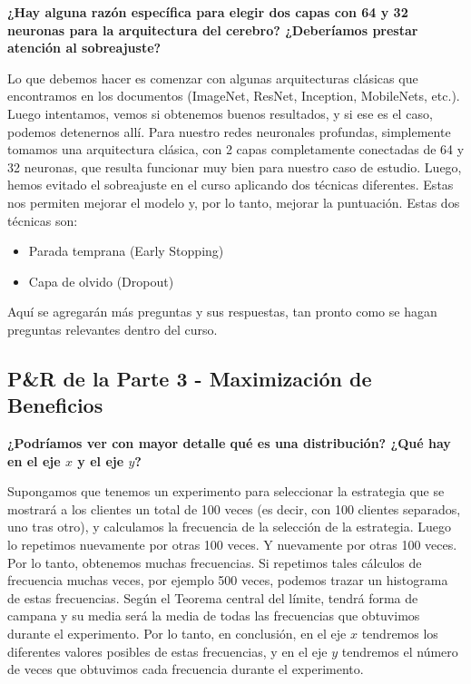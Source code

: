 \documentclass[]{book}
\providecommand{\tightlist}{%
  \setlength{\itemsep}{0pt}\setlength{\parskip}{0pt}}
\begin{document}
\textbf{¿Hay alguna razón específica para elegir dos capas con 64 y 32 neuronas para la arquitectura del cerebro? ¿Deberíamos prestar atención al sobreajuste?}

Lo que debemos hacer es comenzar con algunas arquitecturas clásicas que encontramos en los documentos (ImageNet, ResNet, Inception, MobileNets, etc.). Luego intentamos, vemos si obtenemos buenos resultados, y si ese es el caso, podemos detenernos allí. Para nuestro redes neuronales profundas, simplemente tomamos una arquitectura clásica, con 2 capas completamente conectadas de 64 y 32 neuronas, que resulta funcionar muy bien para nuestro caso de estudio. Luego, hemos evitado el sobreajuste en el curso aplicando dos técnicas diferentes. Estas nos permiten mejorar el modelo y, por lo tanto, mejorar la puntuación. Estas dos técnicas son:

\begin{itemize}
\tightlist
\item
  Parada temprana (Early Stopping)
\item
  Capa de olvido (Dropout)
\end{itemize}

Aquí se agregarán más preguntas y sus respuestas, tan pronto como se hagan preguntas relevantes dentro del curso.

\hypertarget{pr-de-la-parte-3---maximizaciuxf3n-de-beneficios}{%
\subsection{P\&R de la Parte 3 - Maximización de Beneficios}\label{pr-de-la-parte-3---maximizaciuxf3n-de-beneficios}}

\textbf{¿Podríamos ver con mayor detalle qué es una distribución? ¿Qué hay en el eje \(x\) y el eje \(y\)?}

Supongamos que tenemos un experimento para seleccionar la estrategia que se mostrará a los clientes un total de 100 veces (es decir, con 100 clientes separados, uno tras otro), y calculamos la frecuencia de la selección de la estrategia. Luego lo repetimos nuevamente por otras 100 veces. Y nuevamente por otras 100 veces. Por lo tanto, obtenemos muchas frecuencias. Si repetimos tales cálculos de frecuencia muchas veces, por ejemplo 500 veces, podemos trazar un histograma de estas frecuencias. Según el Teorema central del límite, tendrá forma de campana y su media será la media de todas las frecuencias que obtuvimos durante el experimento. Por lo tanto, en conclusión, en el eje \(x\) tendremos los diferentes valores posibles de estas frecuencias, y en el eje \(y\) tendremos el número de veces que obtuvimos cada frecuencia durante el experimento.
\end{document}
